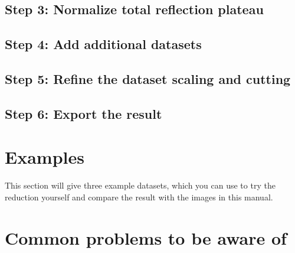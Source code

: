   \subsection{Step 3: Normalize total reflection plateau}
  
  \subsection{Step 4: Add additional datasets}

  \subsection{Step 5: Refine the dataset scaling and cutting}
  \label{sec:scaling}
  
  \subsection{Step 6: Export the result}
  \label{sec:export}
  
  
\section{Examples}
  This section will give three example datasets, which you can use to try the reduction yourself and compare the result with the images in this manual.
  
\section{Common problems to be aware of}
